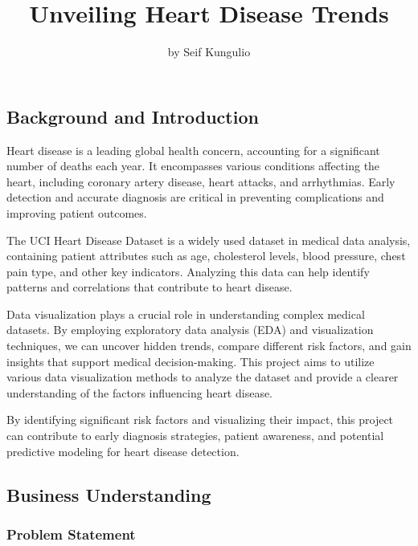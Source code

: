 \documentclass[
]{article}
\title{Unveiling Heart Disease Trends}
\author{by Seif Kungulio}
\date{}
\begin{document}
\maketitle

\subsection{\texorpdfstring{\textbf{Background and
Introduction}}{Background and Introduction}}\label{background-and-introduction}

Heart disease is a leading global health concern, accounting for a
significant number of deaths each year. It encompasses various
conditions affecting the heart, including coronary artery disease, heart
attacks, and arrhythmias. Early detection and accurate diagnosis are
critical in preventing complications and improving patient outcomes.

The UCI Heart Disease Dataset is a widely used dataset in medical data
analysis, containing patient attributes such as age, cholesterol levels,
blood pressure, chest pain type, and other key indicators. Analyzing
this data can help identify patterns and correlations that contribute to
heart disease.

Data visualization plays a crucial role in understanding complex medical
datasets. By employing exploratory data analysis (EDA) and visualization
techniques, we can uncover hidden trends, compare different risk
factors, and gain insights that support medical decision-making. This
project aims to utilize various data visualization methods to analyze
the dataset and provide a clearer understanding of the factors
influencing heart disease.

By identifying significant risk factors and visualizing their impact,
this project can contribute to early diagnosis strategies, patient
awareness, and potential predictive modeling for heart disease
detection.

\subsection{\texorpdfstring{\textbf{Business
Understanding}}{Business Understanding}}\label{business-understanding}

\subsubsection{\texorpdfstring{\textbf{Problem
Statement}}{Problem Statement}}\label{problem-statement}
\end{document}

